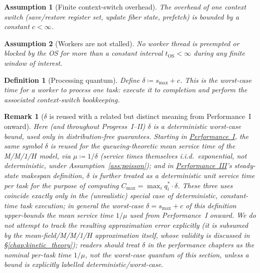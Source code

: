 \documentclass[11pt,a4paper]{article}
\newtheorem{definition}{Definition}[section]
\newtheorem{assumption}{Assumption}[section]
\newtheorem{remark}{Remark}[section]
\begin{document}
\begin{assumption}[Finite context-switch overhead]
\label{ass:c}
The overhead of one context switch (save/restore register set,
update fiber state, prefetch) is bounded by a constant $c < \infty$.
\end{assumption}

\begin{assumption}[Workers are not stalled]
\label{ass:live}
No worker thread is preempted or blocked by the OS for more than
a constant interval $t_{\text{OS}} < \infty$ during any finite
window of interest.
\end{assumption}

\begin{definition}[Processing quantum]
\label{def:delta}
Define $\delta \coloneqq s_{\max} + c$.  This is the worst-case
time for a worker to process one task: execute it to completion
and perform the associated context-switch bookkeeping.
\end{definition}

\begin{remark}[$\delta$ is reused with a related but distinct meaning
from Performance~I onward]
\label{rem:delta-overload}
Here (and throughout Progress~I--II) $\delta$ is a deterministic
\emph{worst-case} bound, used only in distribution-free guarantees.
Starting in \hyperref[chap:load_balance]{Performance~I}, the same symbol
$\delta$ is reused for the queueing-theoretic \emph{mean} service time of
the M/M/1/$H$ model, via $\mu \coloneqq 1/\delta$ (service times
themselves i.i.d.\ exponential, not deterministic, under
Assumption~\ref{ass:poisson}); and in
\hyperref[chap:makespan]{Performance~III}'s steady-state makespan
definition, $\delta$ is further treated as a \emph{deterministic unit
service time per task} for the purpose of computing
$C_{\max} = \max_i q_i^* \cdot \delta$. These three uses coincide
\emph{exactly} only in the (unrealistic) special case of deterministic,
constant-time task execution; in general the worst-case
$\delta = s_{\max}+c$ of this definition upper-bounds the mean service
time $1/\mu$ used from Performance~I onward. We do not attempt to
track the resulting approximation error explicitly (it is subsumed by
the mean-field/M/M/1/$H$ approximation itself, whose validity is
discussed in \S\ref{chap:kinetic_theory}); readers should treat
$\delta$ in the performance chapters as the \emph{nominal} per-task time
$1/\mu$, not the worst-case quantum of this section, unless a bound is
explicitly labelled deterministic/worst-case.
\end{remark}
\end{document}
